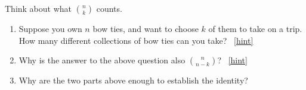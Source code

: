\documentclass{book}
\begin{document}
\setcounter{project}{74}
\addtocounter{project}{-1}
\begin{activity}[]\label{act-pascalsym-dc}
\hypertarget{p-588}{}%
Think about what \(\binom{n}{k}\) counts.%
\begin{enumerate}[font=\bfseries,label=(\alph*),ref=\alph*]
\item\label{task-105} \hypertarget{p-589}{}%
Suppose you own \(n\) bow ties, and want to choose \(k\) of them to take on a trip.  How many different collections of bow ties can you take?%
~\hfill{\tiny\hyperlink{a-74.a}{[hint]}\hypertarget{q-74.a}{}}\item\label{task-106} \hypertarget{p-592}{}%
Why is the answer to the above question also \(\binom{n}{n-k}\)?%
~\hfill{\tiny\hyperlink{a-74.b}{[hint]}\hypertarget{q-74.b}{}}\item\label{task-107} \hypertarget{p-595}{}%
Why are the two parts above enough to establish the identity?%
\end{enumerate}
\end{activity}
\end{document}
